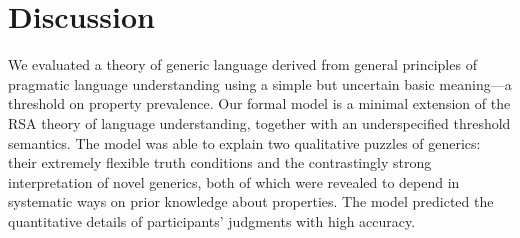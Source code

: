 \documentclass[12pt,letterpaper]{article}
\begin{document}



%

\section*{Discussion}

We evaluated a theory of generic language derived from general principles of pragmatic language understanding using a simple but uncertain basic meaning---a threshold on property prevalence.
Our formal model is a minimal extension of the RSA theory of language understanding, together with an underspecified threshold semantics.
The model was able to explain two qualitative puzzles of generics: their extremely flexible truth conditions and the contrastingly strong interpretation of novel generics, both of which were revealed to depend in systematic ways on prior knowledge about properties. The model predicted the quantitative details of participants' judgments with high accuracy.
\end{document}

